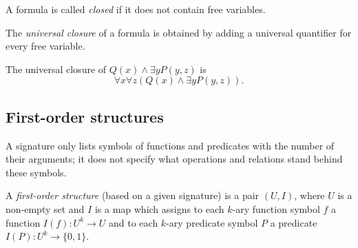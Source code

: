\begin{page}
\setcounter{section}{1}
\setcounter{subsection}{3}
\setcounter{dfn}{8}
\label{portion:510}

\begin{dfn}
A formula is called \emph{closed} if it does not contain free variables.
\end{dfn}

\end{page}

\begin{page}
\setcounter{section}{1}
\setcounter{subsection}{3}
\setcounter{dfn}{9}
\label{portion:513}

\begin{dfn}
The \emph{universal closure} of a formula is obtained by adding a universal quantifier for every free variable.
\end{dfn}

\end{page}

\begin{page}
\setcounter{section}{1}
\setcounter{subsection}{3}
\setcounter{dfn}{10}
\label{portion:516}

\begin{exl}
The universal closure of $Q(x) \wedge \exists y P(y,z)$ is
\[
\forall x \forall z (Q(x) \wedge \exists y P(y,z)).
\]
\end{exl}

\end{page}

\begin{page}
\setcounter{section}{1}
\setcounter{subsection}{4}
\setcounter{dfn}{10}
\label{portion:518}

\subsection{First-order structures}
A signature only lists symbols of functions and predicates with the number of their arguments;
it does not specify what operations and relations stand behind these symbols.


\end{page}

\begin{page}
\setcounter{section}{1}
\setcounter{subsection}{4}
\setcounter{dfn}{11}
\label{portion:520}

\begin{dfn}
A \emph{first-order structure} (based on a given signature) is a pair $(U, I)$, where
$U$ is a non-empty set and $I$ is a map which assigns to each $k$-ary function symbol $f$
a function $I(f) \colon U^k \to U$ and to each $k$-ary predicate symbol $P$ a predicate $I(P) \colon U^k \to \{0,1\}$.
\end{dfn}

\end{page}

